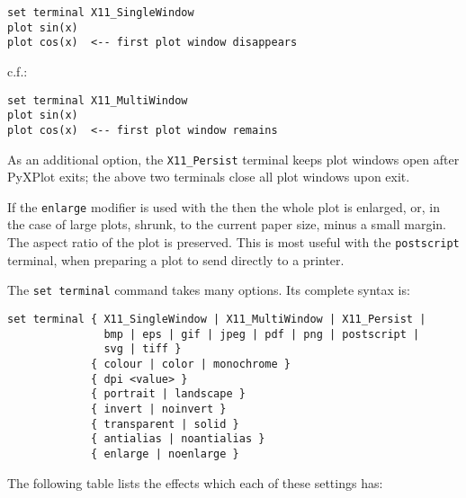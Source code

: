 \begin{verbatim}
set terminal X11_SingleWindow
plot sin(x)
plot cos(x)  <-- first plot window disappears
\end{verbatim}

\noindent c.f.:

\begin{verbatim}
set terminal X11_MultiWindow
plot sin(x)
plot cos(x)  <-- first plot window remains
\end{verbatim}

As an additional option, the {\tt X11\_Persist} terminal keeps plot windows
open after PyXPlot exits; the above two terminals close all plot windows upon
exit.

If the {\tt enlarge} modifier is used with the  then the
whole plot is enlarged, or, in the case of large plots, shrunk, to the current
paper size, minus a small margin. The aspect ratio of the plot is preserved.
This is most useful with the {\tt postscript} terminal, when preparing a plot
to send directly to a printer.

The {\tt set terminal} command takes many options. Its complete syntax is:

\begin{verbatim}
set terminal { X11_SingleWindow | X11_MultiWindow | X11_Persist |
               bmp | eps | gif | jpeg | pdf | png | postscript |
               svg | tiff }
             { colour | color | monochrome }
             { dpi <value> }
             { portrait | landscape }
             { invert | noinvert }
             { transparent | solid }
             { antialias | noantialias }
             { enlarge | noenlarge }
\end{verbatim}

The following table lists the effects which each of these settings has:

